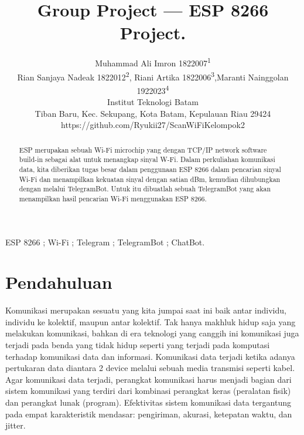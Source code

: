 \documentclass[conference]{IEEEtran}
\begin{document}
\title{Group Project --- ESP 8266 Project.\\
}

\author{
    Muhammad Ali Imron 1822007\textsuperscript{\rm 1}\\
    Rian Sanjaya Nadeak 1822012\textsuperscript{\rm 2},
    Riani Artika 1822006\textsuperscript{\rm 3},Maranti Nainggolan 1922023\textsuperscript{\rm 4}\\
    Institut Teknologi Batam\\
    Tiban Baru, Kec. Sekupang, Kota Batam, Kepulauan Riau 29424\\
    https://github.com/Ryukii27/ScanWiFiKelompok2}

\maketitle

\begin{abstract}
    ESP merupakan sebuah Wi-Fi microchip yang dengan TCP/IP network software build-in sebagai alat untuk menangkap sinyal W-Fi. Dalam perkuliahan komunikasi data, kita diberikan tugas besar dalam penggunaan ESP 8266 dalam pencarian sinyal Wi-Fi dan menampilkan kekuatan sinyal dengan satian dBm, kemudian dihubungkan dengan melalui TelegramBot. Untuk itu dibuatlah sebuah TelegramBot yang akan menampilkan hasil pencarian Wi-Fi menggunakan ESP 8266.
\end{abstract}

\begin{IEEEkeywords}
    ESP 8266 ; Wi-Fi ; Telegram ; TelegramBot ; ChatBot.
\end{IEEEkeywords}

\section{Pendahuluan}
Komunikasi merupakan sesuatu yang kita jumpai saat ini baik antar individu, individu ke kolektif, maupun antar kolektif. Tak hanya makhluk hidup saja yang melakukan komunikasi, bahkan di era teknologi yang canggih ini komunikasi juga terjadi pada benda yang tidak hidup seperti yang terjadi pada komputasi terhadap komunikasi data dan informasi. Komunikasi data terjadi ketika adanya pertukaran data diantara 2 device melalui sebuah media transmisi seperti kabel. Agar komunikasi data terjadi, perangkat komunikasi harus menjadi bagian dari sistem komunikasi yang terdiri dari kombinasi perangkat keras (peralatan fisik) dan perangkat lunak (program). Efektivitas sistem komunikasi data tergantung pada empat karakteristik mendasar: pengiriman, akurasi, ketepatan waktu, dan jitter.
\end{document}
